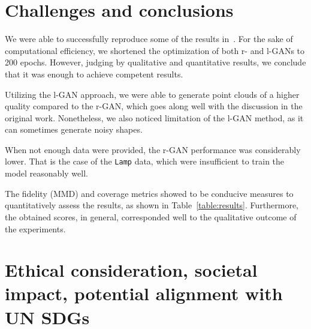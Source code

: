 \documentclass[12pt]{article}
\newcommand{\contentdescription}[1]{}
\begin{document}
    \section{Challenges and conclusions}
    \label{sec:conclusions}
    \contentdescription{
        Challenges and Conclusions (5-15\%):
        Challenges you faced when reimplementing the paper and conducting the experiments.
        Were all details in the paper?
        Or did you have to look in the authors code or even contact them to find about some details?
        Were parts of the code quite hard to get them to work as intended?
        Did you have optimize and tune several hyperparameters?
        Which ones?
        Did the framework you used make the implementation difficult in some ways?

        Summarize your key results - what have you learned?
        What points do you think one should consider when using the approach of the paper you chose for your project?
        Suggest ideas for future extensions or new applications of your ideas.
    }
    We were able to successfully reproduce some of the results in~\cite{pmlr-v80-achlioptas18a}.
    For the sake of computational efficiency, we shortened the optimization of both r- and l-GANs to 200 epochs. However, judging by qualitative and quantitative results, we conclude that it was enough to achieve competent results.

    Utilizing the l-GAN approach, we were able to generate point clouds of a higher quality compared to the r-GAN, which goes along well with the discussion in the original work.
    Nonetheless, we also noticed limitation of the l-GAN method, as it can sometimes generate noisy shapes.

    When not enough data were provided, the r-GAN performance was considerably lower. That is the case of the \verb|Lamp| data, which were insufficient to train the model reasonably well.

    The fidelity (MMD) and coverage metrics showed to be conducive measures to quantitatively assess the results, as shown in Table~\ref{table:results}. Furthermore, the obtained scores, in general, corresponded well to the qualitative outcome of the experiments.


    \section{Ethical consideration, societal impact, potential alignment with UN SDGs}
    \contentdescription{
        Ethical consideration, societal impact, potential alignment with UN SDGs (5-10\%):
        Think and research!
        Are there any ethical considerations for the original paper, its problem or method, its way of conducting experiments?
        How about your task, your datasets, and the experiments you did?
        What societal impact can you imagine about the original paper and its contributions and results?
        How about your project report?
        How do you think this paper can push the UN SDG targets?
    }
\end{document}
